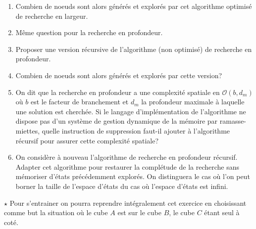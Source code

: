 \begin{td-exo}[]
\begin{enumerate}

		\item Combien de noeuds sont alors générés et explorés par cet algorithme
		optimisé de recherche en largeur.

		\item Même question pour la recherche en profondeur. 

		\item Proposer une version récursive de l'algorithme (non optimisé) de recherche en profondeur.

		\item Combien de noeuds sont alors générés et explorés par cette version?

		\item On dit que la recherche en profondeur a une complexité spatiale en \(\mathcal{O}(b,d_m)\)
		où \(b\) est le facteur de branchement et \(d_m\) la profondeur maximale à laquelle une 
		solution est cherchée. Si le langage d'implémentation de l'algorithme ne dispose pas d'un
		système de gestion dynamique de la mémoire par \og{}ramasse-miettes\fg{}, quelle
		instruction de suppression faut-il ajouter à l'algorithme récursif pour assurer cette
		complexité spatiale?

		\item On considère à nouveau l'algorithme de recherche en profondeur récursif. Adapter
		cet algorithme pour restaurer la complétude de la recherche sans mémoriser d'états 
		précédemment explorés. On distinguera le cas où l'on peut borner la taille de l'espace
		d'états du cas où l'espace d'états est infini.
	\end{enumerate}

	\(\star\) Pour s'entrainer on pourra reprendre intégralement cet exercice en choisissant comme
	but la situation où le cube \(A\) est sur le cube \(B\), le cube \(C\) étant seul à coté.
\end{td-exo}

